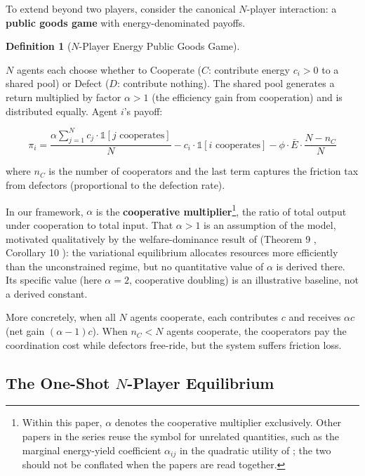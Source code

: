 \documentclass[11pt]{article}
\theoremstyle{plain}
\theoremstyle{definition}
\newtheorem{definition}{Definition}
\theoremstyle{remark}
\let\origsubsection\subsection
\renewcommand{\subsection}{\needspace{7\baselineskip}\origsubsection}
\begin{document}
To extend beyond two players, consider the canonical \(N\)-player
interaction: a \textbf{public goods game} with energy-denominated
payoffs.

\begin{definition}[$N$-Player Energy Public Goods Game]
\label{def-n-player-public-goods}

$N$ agents each choose whether to Cooperate ($C$: contribute energy $c_i > 0$ to a shared pool) or Defect ($D$: contribute nothing). The shared pool generates a return multiplied by factor $\alpha > 1$ (the efficiency gain from cooperation) and is distributed equally. Agent $i$'s payoff:

$$\pi_i = \frac{\alpha \sum_{j=1}^{N} c_j \cdot \mathds{1}[j \text{ cooperates}]}{N} - c_i \cdot \mathds{1}[i \text{ cooperates}] - \phi \cdot \bar{E} \cdot \frac{N - n_C}{N}$$

where $n_C$ is the number of cooperators and the last term captures the friction tax from defectors (proportional to the defection rate).
\end{definition}

In our framework, \(\alpha\) is the \textbf{cooperative
multiplier}\footnote{Within this paper, \(\alpha\) denotes the
  cooperative multiplier exclusively. Other papers in the series reuse
  the symbol for unrelated quantities, such as the marginal energy-yield
  coefficient \(\alpha_{ij}\) in the quadratic utility of \citep{TC-I};
  the two should not be conflated when the papers are read together.},
the ratio of total output under cooperation to total input. That
\(\alpha > 1\) is an assumption of the model, motivated qualitatively by
the welfare-dominance result of \citep{TC-I} (Theorem 9 \citep{TC-I},
Corollary 10 \citep{TC-I}): the variational equilibrium allocates
resources more efficiently than the unconstrained regime, but no
quantitative value of \(\alpha\) is derived there. Its specific value
(here \(\alpha = 2\), cooperative doubling) is an illustrative baseline,
not a derived constant.

More concretely, when all \(N\) agents cooperate, each contributes \(c\)
and receives \(\alpha c\) (net gain \((\alpha - 1)c\)). When \(n_C < N\)
agents cooperate, the cooperators pay the coordination cost while
defectors free-ride, but the system suffers friction loss.

\subsection{\texorpdfstring{The One-Shot \(N\)-Player
Equilibrium}{The One-Shot N-Player Equilibrium}}\label{the-one-shot-n-player-equilibrium}
\end{document}
